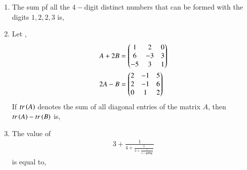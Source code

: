 \documentclass[journal]{IEEEtran}
\begin{document}
\begin{enumerate}
\begin{enumerate}
		\end{enumerate}
	\item The sum pf all the $4-$digit distinct numbers that can be formed with the digits $1,2,2,3$ is,
		\begin{enumerate}
		\end{enumerate}
	\item Let ,
		\begin{align*}
			&A+2B=\begin{pmatrix}1&2&0\\6&-3&3\\-5&3&1\end{pmatrix}\\
			&2A-B=\begin{pmatrix}2&-1&5\\2&-1&6\\0&1&2\end{pmatrix}
		\end{align*}
		If $tr\left(A\right)$ denotes the sum of all diagonal entries of the matrix $A$, then $tr\left(A\right)-tr\left(B\right)$ is,
		\begin{enumerate}
				\begin{multicols}{2}
					\item $0$
				\columnbreak
					\item $1$
				\end{multicols}
				\begin{multicols}{2}
					\item $2$
				\columnbreak
					\item $3$
				\end{multicols}
		\end{enumerate}
	\item The value of 
		\begin{align*}
			3+\frac{1}{4+\frac{1}{3+\frac{1}{4+\frac{1}{3+\dots \infty}}}}
		\end{align*}
		is equal to,
		\begin{enumerate}
				\begin{multicols}{2}
				\item $1.5+\sqrt{3}$

\end{multicols}
\end{enumerate}
\end{enumerate}
\end{document}
